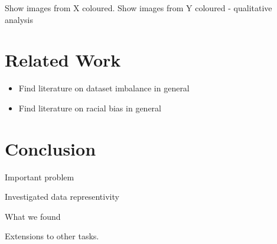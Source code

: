\documentclass[conference]{IEEEtran}
\begin{document}
Show images from X coloured.
Show images from Y coloured - qualitative analysis



\section{Related Work}

\begin{itemize}
    \item Find literature on dataset imbalance in general
    \item Find literature on racial bias in general
\end{itemize}

\section{Conclusion}

Important problem

Investigated data representivity

What we found

Extensions to other tasks.

\medskip
 




\end{document}
